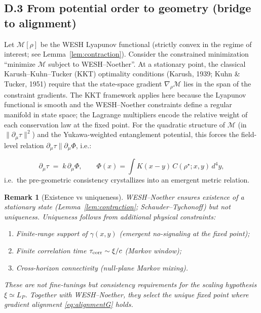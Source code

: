 \documentclass[12pt,a4paper]{article}
\newtheorem{remark}{Remark}[section]
\numberwithin{equation}{section}
\begin{document}
\subsection*{D.3 From potential order to geometry (bridge to alignment)}
\vspace{0.3cm}
Let $\mathcal M[\rho]$ be the WESH Lyapunov functional (strictly convex in the regime of interest; see Lemma~\ref{lem:contraction}). Consider the constrained minimization “minimize $\mathcal M$ subject to WESH--Noether”. At a stationary point, the classical Karush--Kuhn--Tucker (KKT) optimality conditions (Karush, 1939; Kuhn \& Tucker, 1951) require that the state-space gradient $\nabla_\rho\mathcal M$ lies in the span of the constraint gradients. The KKT framework applies here because the Lyapunov functional is smooth and the WESH--Noether constraints define a regular manifold in state space; the Lagrange multipliers encode the relative weight of each conservation law at the fixed point. For the quadratic structure of $\mathcal M$ (in $\|\partial_\mu\tau\|^2$) and the Yukawa-weighted entanglement potential, this forces the field-level relation $\partial_\mu\tau \parallel \partial_\mu\Phi$, i.e.:

\begin{equation}
\partial_\mu \tau \;=\; k\,\partial_\mu \Phi,
\qquad
\Phi(x)=\!\int\! K(x-y)\,C(\rho^\star;x,y)\,d^4y,
\label{eq:alignmentG}
\end{equation}
i.e.\ the pre-geometric consistency crystallizes into an emergent metric relation.

\begin{remark}[Existence vs uniqueness]\label{rem:H-unique}
WESH--Noether ensures \emph{existence} of a stationary state (Lemma~\ref{lem:contraction}; Schauder--Tychonoff) but not uniqueness. Uniqueness follows from additional physical constraints:
\begin{enumerate}[label=(\roman*),leftmargin=1.5cm,itemsep=0.2em]
\item Finite-range support of $\gamma(x,y)$ (emergent no-signaling at the fixed point);
\item Finite correlation time $\tau_{\rm corr}\sim\xi/c$ (Markov window);
\item Cross-horizon connectivity (null-plane Markov mixing).
\end{enumerate}
These are not fine-tunings but \emph{consistency requirements} for the scaling hypothesis $\xi\simeq L_P$. Together with WESH--Noether, they select the unique fixed point where gradient alignment \eqref{eq:alignmentG} holds.
\end{remark}
\end{document}
